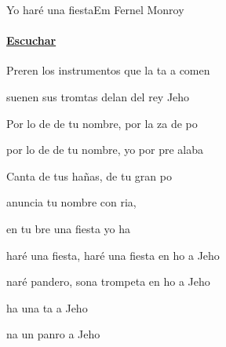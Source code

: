 \documentclass[12pt, spanish]{book}
\begin{document}
    \begin{song}{Yo haré una fiesta}{Em}
        {} %
        {Fernel Monroy}
        {} %
        {} %
        \ifChordBk
        \paragraph{\mbox{}\hfill\protect\href{https://open.spotify.com/intl-es/track/41n1eoj7BnCs2mHc7UvGqz}{Escuchar}\mbox{}\hfill}
        \fi


        \begin{SBOpGroup}
            Preren los instrumentos que la ta  a comen

            suenen sus tromtas delan del rey Jeho
        \end{SBOpGroup}

        \begin{SBOpGroup}
            Por lo de de tu nombre, por la za de  po 

            por lo de de tu nombre, yo por pre  alaba

            Canta de tus hañas, de tu gran po   

            anuncia tu nombre con ria,

            en tu bre una fiesta yo ha   
        \end{SBOpGroup}

        \begin{SBChorus}
             haré una fiesta,  haré una fiesta en ho a Jeho   

            naré pandero, sona trompeta en ho a Jeho   

             ha una ta a Jeho   

            na un panro a Jeho   
        \end{SBChorus}


\end{song}
\end{document}
